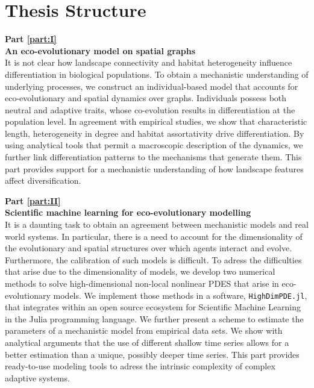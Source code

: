
\section{Thesis Structure}
\label{sec:intro:structure}

\textbf{Part \ref{part:I}\\
An eco-evolutionary model on spatial graphs} \\[0.2em]
It is not clear how landscape connectivity and habitat heterogeneity influence differentiation in biological populations. 
%
To obtain a mechanistic understanding of underlying processes, we construct an individual-based model that accounts for eco-evolutionary and spatial dynamics over graphs. 
%
Individuals possess both neutral and adaptive traits, whose co-evolution results in differentiation at the population level.
%
In agreement with empirical studies, we show that characteristic length, heterogeneity in degree and habitat assortativity drive differentiation.
%
By using analytical tools that permit a macroscopic description of the dynamics, we further link differentiation patterns to the mechanisms that generate them.
%
This part provides support for a mechanistic understanding of how landscape features affect diversification.

\textbf{Part \ref{part:II}\\
Scientific machine learning for eco-evolutionary modelling} \\[0.2em]
%
It is a daunting task to obtain an agreement between mechanistic models and real world systems. In particular, there is a need to account for the dimensionality of the evolutionary and spatial structures over which agents interact and evolve. Furthermore, the calibration of such models is difficult.
%
To adress the difficulties that arise due to the dimensionality of models, we develop two numerical methods to solve high-dimensional non-local nonlinear PDES that arise in eco-evolutionary models. We implement those methods in a software, \texttt{HighDimPDE.jl}, that integrates within an open source ecosystem for Scientific Machine Learning in the Julia programming language.
%
We further present a scheme to estimate the parameters of a mechanistic model from empirical data sets. We show with analytical arguments that the use of different shallow time series allows for a better estimation than a unique, possibly deeper time series.
%
This part provides ready-to-use modeling tools to adress the intrinsic complexity of complex adaptive systems.

